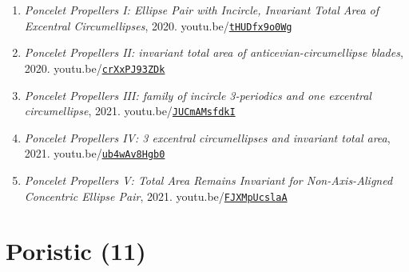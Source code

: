 \documentclass[12pt]{article}
\begin{document}
\begin{enumerate}[resume]
\item \textit{Poncelet Propellers I: Ellipse Pair with Incircle, Invariant Total Area of Excentral Circumellipses}, 2020. youtu.be/\href{https://youtu.be/tHUDfx9o0Wg}{\nolinkurl{tHUDfx9o0Wg}}
\item \textit{Poncelet Propellers II: invariant total area of anticevian-circumellipse blades}, 2020. youtu.be/\href{https://youtu.be/crXxPJ93ZDk}{\nolinkurl{crXxPJ93ZDk}}
\item \textit{Poncelet Propellers III: family of incircle 3-periodics and one excentral circumellipse}, 2021. youtu.be/\href{https://youtu.be/JUCmAMsfdkI}{\nolinkurl{JUCmAMsfdkI}}
\item \textit{Poncelet Propellers IV: 3 excentral circumellipses and invariant total area}, 2021. youtu.be/\href{https://youtu.be/ub4wAv8Hgb0}{\nolinkurl{ub4wAv8Hgb0}}
\item \textit{Poncelet Propellers V: Total Area Remains Invariant for Non-Axis-Aligned Concentric Ellipse Pair}, 2021. youtu.be/\href{https://youtu.be/FJXMpUcslaA}{\nolinkurl{FJXMpUcslaA}}
\end{enumerate}

\section{Poristic (11)}
\end{document}

